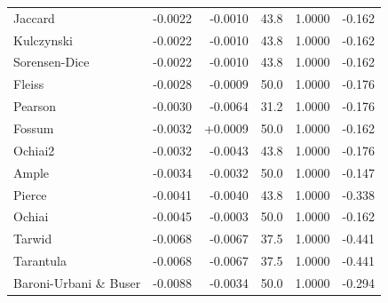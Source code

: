 \begin{table}[t]
{\begin{tabular}{lrrrrr}
Jaccard & -0.0022 & -0.0010 & 43.8 & 1.0000 & -0.162 \\
Kulczynski & -0.0022 & -0.0010 & 43.8 & 1.0000 & -0.162 \\
Sorensen-Dice & -0.0022 & -0.0010 & 43.8 & 1.0000 & -0.162 \\
Fleiss & -0.0028 & -0.0009 & 50.0 & 1.0000 & -0.176 \\
Pearson & -0.0030 & -0.0064 & 31.2 & 1.0000 & -0.176 \\
Fossum & -0.0032 & +0.0009 & 50.0 & 1.0000 & -0.162 \\
Ochiai2 & -0.0032 & -0.0043 & 43.8 & 1.0000 & -0.176 \\
Ample & -0.0034 & -0.0032 & 50.0 & 1.0000 & -0.147 \\
Pierce & -0.0041 & -0.0040 & 43.8 & 1.0000 & -0.338 \\
Ochiai & -0.0045 & -0.0003 & 50.0 & 1.0000 & -0.162 \\
Tarwid & -0.0068 & -0.0067 & 37.5 & 1.0000 & -0.441 \\
Tarantula & -0.0068 & -0.0067 & 37.5 & 1.0000 & -0.441 \\
Baroni-Urbani \& Buser & -0.0088 & -0.0034 & 50.0 & 1.0000 & -0.294 \\
\bottomrule
\end{tabular}
}
\end{table}
